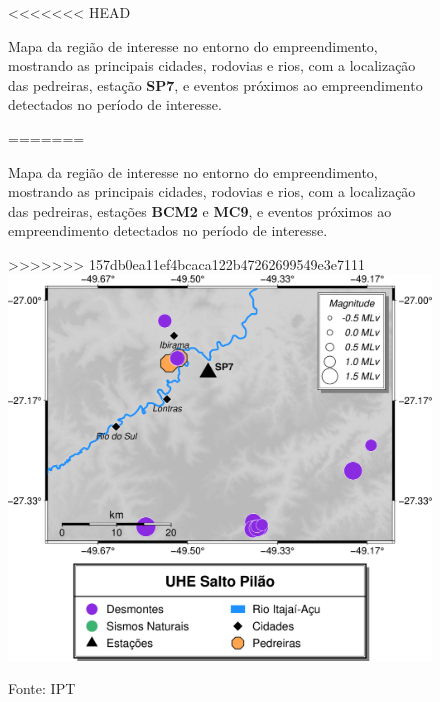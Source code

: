 
    \begin{figure}[hp]
    \centering
<<<<<<< HEAD
	\captionsetup{justification=justified, singlelinecheck=false, width=1\textwidth}
    \caption{Mapa da região de interesse no entorno do empreendimento, mostrando as principais cidades, rodovias e rios, com a localização das pedreiras, estação \textbf{SP7}, e eventos próximos ao empreendimento detectados no período de interesse.}
=======
    \captionsetup{justification=justified, singlelinecheck=false, width=1\textwidth}
    \caption{Mapa da região de interesse no entorno do empreendimento, mostrando as principais cidades, rodovias e rios, com a localização das pedreiras, estações \textbf{BCM2} e \textbf{MC9}, e eventos próximos ao empreendimento detectados no período de interesse.}
>>>>>>> 157db0ea11ef4bcaca122b47262699549e3e7111
    \includegraphics[width=1.0\textwidth]{./boletim/main/figuras/mapaevents.png}
    \caption*{Fonte: IPT}
    \end{figure}
    \newpage
    